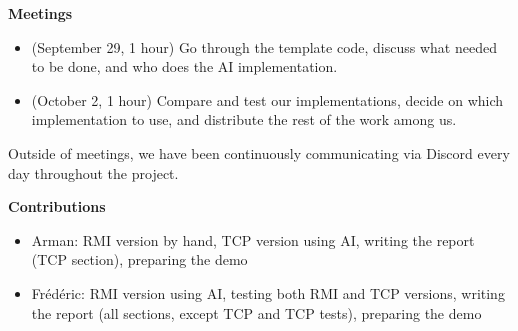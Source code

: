 \documentclass[10pt]{article}
\begin{document}
\textbf{Meetings}
\begin{itemize}
\item (September 29, 1 hour) Go through the template code, discuss what
  needed to be done, and who does the AI implementation.
\item (October 2, 1 hour) Compare and test our implementations, decide on
  which implementation to use, and distribute the rest of the work among us.
\end{itemize}
Outside of meetings, we have been continuously communicating via Discord every
day throughout the project.

\textbf{Contributions}
\begin{itemize}
\item Arman: RMI version by hand, TCP version using AI, writing the report (TCP
  section), preparing the demo
\item Frédéric: RMI version using AI, testing both RMI and TCP versions, writing
  the report (all sections, except TCP and TCP tests), preparing the demo
\end{itemize}
\end{document}
